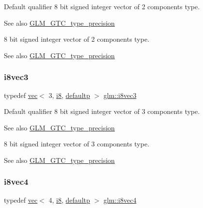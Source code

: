 Default qualifier 8 bit signed integer vector of 2 components type. \begin{DoxySeeAlso}{See also}
\hyperlink{group__gtc__type__precision}{G\+L\+M\+\_\+\+G\+T\+C\+\_\+type\+\_\+precision}
\end{DoxySeeAlso}
8 bit signed integer vector of 2 components type. \begin{DoxySeeAlso}{See also}
\hyperlink{group__gtc__type__precision}{G\+L\+M\+\_\+\+G\+T\+C\+\_\+type\+\_\+precision} 
\end{DoxySeeAlso}
\mbox{\label{group__gtc__type__precision_ga9babb834daa1f84c23821bd21669c2e8}} 
\subsubsection{\texorpdfstring{i8vec3}{i8vec3}}
{\footnotesize\ttfamily typedef \hyperlink{structglm_1_1vec}{vec}$<$ 3, \hyperlink{group__gtc__type__precision_gaae064be68b7d36cd7910c16e8ad18bba}{i8}, \hyperlink{namespaceglm_a36ed105b07c7746804d7fdc7cc90ff25a9d21ccd8b5a009ec7eb7677befc3bf51}{defaultp} $>$ \hyperlink{group__gtc__type__precision_ga9babb834daa1f84c23821bd21669c2e8}{glm\+::i8vec3}}

Default qualifier 8 bit signed integer vector of 3 components type. \begin{DoxySeeAlso}{See also}
\hyperlink{group__gtc__type__precision}{G\+L\+M\+\_\+\+G\+T\+C\+\_\+type\+\_\+precision}
\end{DoxySeeAlso}
8 bit signed integer vector of 3 components type. \begin{DoxySeeAlso}{See also}
\hyperlink{group__gtc__type__precision}{G\+L\+M\+\_\+\+G\+T\+C\+\_\+type\+\_\+precision} 
\end{DoxySeeAlso}
\mbox{\label{group__gtc__type__precision_gaaad99cfb998ddcb74e9c33d0149fdd0e}} 
\subsubsection{\texorpdfstring{i8vec4}{i8vec4}}
{\footnotesize\ttfamily typedef \hyperlink{structglm_1_1vec}{vec}$<$ 4, \hyperlink{group__gtc__type__precision_gaae064be68b7d36cd7910c16e8ad18bba}{i8}, \hyperlink{namespaceglm_a36ed105b07c7746804d7fdc7cc90ff25a9d21ccd8b5a009ec7eb7677befc3bf51}{defaultp} $>$ \hyperlink{group__gtc__type__precision_gaaad99cfb998ddcb74e9c33d0149fdd0e}{glm\+::i8vec4}}

